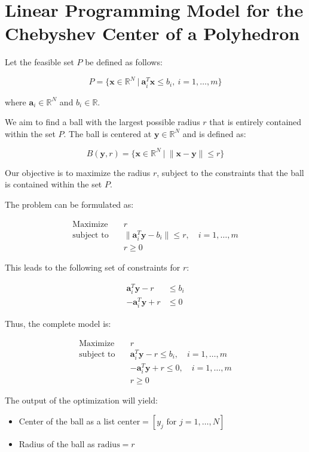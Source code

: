 \documentclass{article}
\begin{document}
\section*{Linear Programming Model for the Chebyshev Center of a Polyhedron}

Let the feasible set \( P \) be defined as follows:

\[
P = \{ \mathbf{x} \in \mathbb{R}^N \ | \ \mathbf{a}_i^T \mathbf{x} \leq b_i, \ i = 1, \ldots, m \}
\]

where \( \mathbf{a}_i \in \mathbb{R}^N \) and \( b_i \in \mathbb{R} \).

We aim to find a ball with the largest possible radius \( r \) that is entirely contained within the set \( P \). The ball is centered at \( \mathbf{y} \in \mathbb{R}^N \) and is defined as:

\[
B(\mathbf{y}, r) = \{ \mathbf{x} \in \mathbb{R}^N \ | \ \|\mathbf{x} - \mathbf{y}\| \leq r \}
\]

Our objective is to maximize the radius \( r \), subject to the constraints that the ball is contained within the set \( P \).

The problem can be formulated as:

\[
\begin{align*}
\text{Maximize} \quad & r \\
\text{subject to} \quad & \|\mathbf{a}_i^T \mathbf{y} - b_i\| \leq r, \quad i = 1, \ldots, m \\
& r \geq 0
\end{align*}
\]

This leads to the following set of constraints for \( r \):

\[
\begin{align*}
\mathbf{a}_i^T \mathbf{y} - r & \leq b_i \\
-\mathbf{a}_i^T \mathbf{y} + r & \leq 0
\end{align*}
\]

Thus, the complete model is:

\[
\begin{align*}
\text{Maximize} \quad & r \\
\text{subject to} \quad & \mathbf{a}_i^T \mathbf{y} - r \leq b_i, \quad i = 1, \ldots, m \\
& -\mathbf{a}_i^T \mathbf{y} + r \leq 0, \quad i = 1, \ldots, m \\
& r \geq 0
\end{align*}
\]

The output of the optimization will yield:

\begin{itemize}
    \item Center of the ball as a list \( \text{center} = [y_j \text{ for } j = 1, \ldots, N] \)
    \item Radius of the ball as \( \text{radius} = r \)
\end{itemize}
\end{document}
